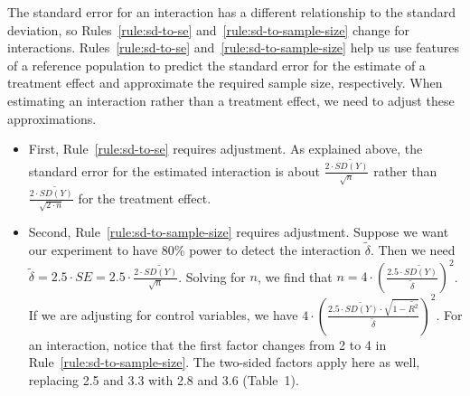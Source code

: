 \documentclass[12pt]{article}
\begin{document}
The standard error for an interaction has a different relationship to the standard deviation, so Rules~\ref{rule:sd-to-se} and~\ref{rule:sd-to-sample-size} change for interactions.
Rules~\ref{rule:sd-to-se} and~\ref{rule:sd-to-sample-size} help us use features of a reference population to predict the standard error for the estimate of a treatment effect and approximate the required sample size, respectively.
When estimating an interaction rather than a treatment effect, we need to adjust these approximations.
\begin{itemize}
    \item First, Rule~\ref{rule:sd-to-se} requires adjustment. As explained above, the standard error for the estimated interaction is about $\frac{2 \cdot \widetilde{SD(Y)}}{\sqrt{n}}$ rather than $\frac{2 \cdot \widetilde{SD(Y)}}{\sqrt{2 \cdot n}}$ for the treatment effect.
    \item Second, Rule~\ref{rule:sd-to-sample-size} requires adjustment.
    Suppose we want our experiment to have 80\% power to detect the interaction $\widetilde{\delta}$.
    Then we need $\widetilde{\delta} = 2.5 \cdot SE = 2.5 \cdot \frac{2 \cdot \widetilde{SD(Y)}}{\sqrt{n}}$.
    Solving for $n$, we find that $n = 4 \cdot \left( \frac{2.5 \cdot \widetilde{SD(Y)}}{\widetilde{\delta}} \right)^{2}$.
    If we are adjusting for control variables, we have $4 \cdot \left( \frac{2.5 \cdot \widetilde{SD(Y)} \cdot \sqrt{1 - \widetilde{R^{2}}}}{\widetilde{\delta}} \right)^{2}$.
    For an interaction, notice that the first factor changes from 2 to 4 in Rule~\ref{rule:sd-to-sample-size}.
    The two-sided factors apply here as well, replacing 2.5 and 3.3 with 2.8 and 3.6 (Table~1).
\end{itemize}
\end{document}
